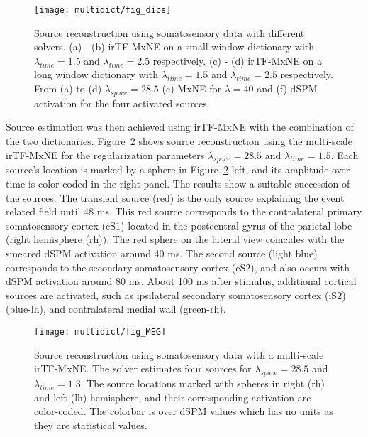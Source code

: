 \begin{figure}
\centering
	\texttt{[image: multidict/fig\_dics]}
    \caption{Source reconstruction using somatosensory data with different solvers. (a) - (b) irTF-MxNE on a small window dictionary with $\lambda_{time}=1.5$ and $\lambda_{time}=2.5$ respectively. (c) - (d) irTF-MxNE on a long window dictionary with $\lambda_{time}=1.5$ and $\lambda_{time}=2.5$ respectively. From (a) to (d) $\lambda_{space}=28.5$ (e) MxNE for $\lambda=40$ and (f) dSPM activation for the four activated sources.}
    \label{fig:MEG_dics}
\end{figure}

Source estimation was then achieved using irTF-MxNE with the combination of the two dictionaries.
Figure~\ref{fig:MEG} shows source reconstruction using the multi-scale irTF-MxNE for the regularization parameters $\lambda_{space}=28.5$ and $\lambda_{time}=1.5$. Each source's location is marked by a sphere in Figure~\ref{fig:MEG}-left, and its amplitude over time is color-coded in the right panel. The results show a suitable succession of the sources. The transient source (red) is the only source explaining the event related field until 48 ms. This red source corresponds to the contralateral primary somatosensory cortex (cS1) located in the postcentral gyrus of the parietal lobe (right hemisphere (rh)). The red sphere on the lateral view coincides with the smeared dSPM activation around 40 ms. The second source (light blue) corresponds to the secondary somatosensory cortex (cS2), and also occurs with dSPM activation around 80 ms. About 100 ms after stimulus, additional cortical sources are activated, such as ipsilateral secondary somatosensory cortex (iS2) (blue-lh), and contralateral medial wall (green-rh). 

\begin{figure}
\centering
	\texttt{[image: multidict/fig\_MEG]}
    \caption{Source reconstruction using somatosensory data with a multi-scale irTF-MxNE. The solver estimates four sources for $\lambda_{space}=28.5$ and $\lambda_{time}=1.3$. The source locations marked with spheres in right (rh) and left (lh) hemisphere, and their corresponding activation are color-coded. The colorbar is over dSPM values which has no units as they are statistical values.}
	\label{fig:MEG}
\end{figure}

